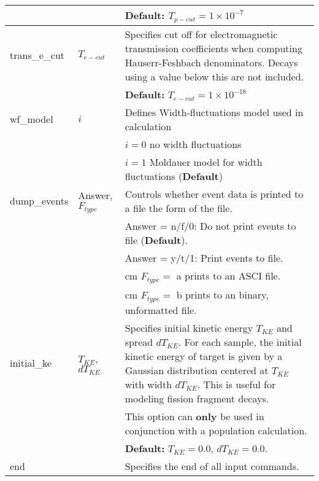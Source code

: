 \documentclass[
10pt,
showpacs,preprintnumbers,nofootinbib,
amsmath,amssymb,
aps,prc,groupedaddress,superscriptaddress,
notitlepage,showkeys
]{revtex4-1}
\begin{document}
\begin{center}
\begin{tabular}{| p{4cm} | p{4cm} | p{9cm} |}
& & {\bf Default:} $T_{p-cut} = 1\times 10^{-7}$\\
\hline
trans\_e\_cut & $T_{e-cut}$ & Specifies cut off for electromagnetic transmission coefficients when computing Hauserr-Feshbach denominators. Decays using a value below this are not included.\\
& & {\bf Default:} $T_{e-cut} = 1\times 10^{-18}$\\
\hline
wf\_model  & $i$ &    Defines Width-fluctuations model used in calculation \\
& &    $i = 0$ no width fluctuations\\
& &    $i = 1$ Moldauer model for width fluctuations ({\bf Default})\\
\hline
dump\_events & Answer, $F_{type}$ & Controls whether event data is printed to a file the form of the file.\\
& & Answer = n/f/0: Do not print events to file ({\bf Default}).\\
& & Answer = y/t/1: Print events to file.\\
& & \hskip 1.2 cm $F_{type} =$ a prints to an ASCI file.\\
& & \hskip 1.2 cm $F_{type} =$ b prints to an binary, unformatted file.\\
\hline
initial\_ke & $T_{KE}$, $dT_{KE}$ & Specifies initial kinetic energy $T_{KE}$ and spread $dT_{KE}$. For each sample, the initial kinetic energy of target is given by a Gaussian distribution centered at $T_{KE}$ with width $dT_{KE}$. This is useful for modeling fission fragment decays.\\
& & This option can {\bf only} be used in conjunction with a population calculation.\\
& & {\bf Default:} $T_{KE} = 0.0$, $dT_{KE} = 0.0$.\\
\hline
end & & Specifies the end of all input commands.\\
\hline
\end{tabular}
\end{center}
\end{document}
